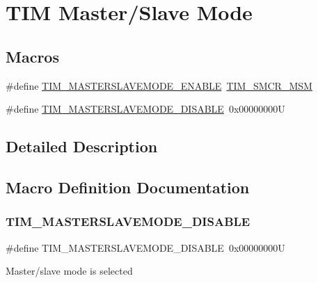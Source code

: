 \hypertarget{group___t_i_m___master___slave___mode}{}\section{T\+IM Master/\+Slave Mode}
\label{group___t_i_m___master___slave___mode}
\subsection*{Macros}
\begin{DoxyCompactItemize}
\item 
\#define \mbox{\hyperlink{group___t_i_m___master___slave___mode_gafdc0de07db4688aa8c87cf03220aaf28}{T\+I\+M\+\_\+\+M\+A\+S\+T\+E\+R\+S\+L\+A\+V\+E\+M\+O\+D\+E\+\_\+\+E\+N\+A\+B\+LE}}~\mbox{\hyperlink{group___peripheral___registers___bits___definition_ga52101db4ca2c7b3003f1b16a49b2032c}{T\+I\+M\+\_\+\+S\+M\+C\+R\+\_\+\+M\+SM}}
\item 
\#define \mbox{\hyperlink{group___t_i_m___master___slave___mode_ga58ff99ef1d6d6f187e3615f9d3ec3b8b}{T\+I\+M\+\_\+\+M\+A\+S\+T\+E\+R\+S\+L\+A\+V\+E\+M\+O\+D\+E\+\_\+\+D\+I\+S\+A\+B\+LE}}~0x00000000U
\end{DoxyCompactItemize}


\subsection{Detailed Description}


\subsection{Macro Definition Documentation}
\mbox{\label{group___t_i_m___master___slave___mode_ga58ff99ef1d6d6f187e3615f9d3ec3b8b}} 
\subsubsection{\texorpdfstring{TIM\_MASTERSLAVEMODE\_DISABLE}{TIM\_MASTERSLAVEMODE\_DISABLE}}
{\footnotesize\ttfamily \#define T\+I\+M\+\_\+\+M\+A\+S\+T\+E\+R\+S\+L\+A\+V\+E\+M\+O\+D\+E\+\_\+\+D\+I\+S\+A\+B\+LE~0x00000000U}

Master/slave mode is selected \mbox{\label{group___t_i_m___master___slave___mode_gafdc0de07db4688aa8c87cf03220aaf28}} 
